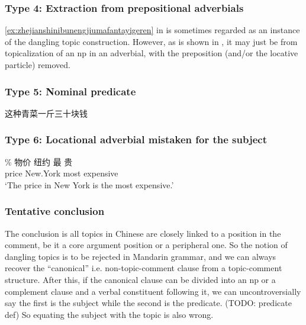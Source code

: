 \documentclass[UTF8, a4paper, oneside, scheme=plain]{ctexrep}
\newcommand{\translate}[1]{`#1'}
\begin{document}
\subsubsection{Type 4: Extraction from prepositional adverbials}

\eqref{ex:zhejianshinibunengjiumafantayigeren} in  
is sometimes regarded as an instance of the dangling topic construction.
However, as is shown in ,
it may just be from topicalization of an \acs{np} in an adverbial,
with the preposition (and/or the locative particle) removed.

\subsubsection{Type 5: Nominal predicate}

\begin{exe}
    \ex 这种青菜一斤三十块钱
\end{exe}

\subsubsection{Type 6: Locational adverbial mistaken for the subject}

\begin{exe}
    \ex \gll \% 物价 纽约 最 贵  \\
    {} price New.York most expensive \\
    \glt \translate{The price in New York is the most expensive.}
\end{exe}

\subsubsection{Tentative conclusion}

The conclusion is all topics in Chinese are closely linked to a position in the comment,
be it a core argument position or a peripheral one.
So the notion of dangling topics is to be rejected in Mandarin grammar,
and we can always recover the ``canonical'' i.e. non-topic-comment clause
from a topic-comment structure.
After this, if the canonical clause can be divided into an \acs{np}
or a complement clause and a verbal constituent following it,
we can uncontroversially say the first is the subject while the second is the predicate. (TODO: predicate def)
So equating the subject with the topic is also wrong.
\end{document}
